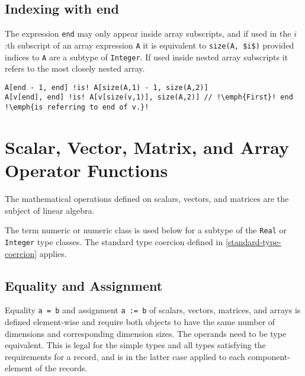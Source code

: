 \subsection{Indexing with end}\label{indexing-with-end}

The expression \lstinline!end! may only appear inside array subscripts, and if used in the $i$:th subscript of an array expression \lstinline!A! it is equivalent
to \lstinline!size(A, $i$)! provided indices to \lstinline!A! are a subtype of \lstinline!Integer!.  If used inside nested array subscripts it refers
to the most closely nested array.

\begin{example}
\begin{lstlisting}[language=modelica, escapechar=!]
A[end - 1, end] !is! A[size(A,1) - 1, size(A,2)]
A[v[end], end] !is! A[v[size(v,1)], size(A,2)] // !\emph{First}! end !\emph{is referring to end of v.}!
\end{lstlisting}
\end{example}

\section{Scalar, Vector, Matrix, and Array Operator Functions}\label{scalar-vector-matrix-and-array-operator-functions}

The mathematical operations defined on scalars, vectors, and matrices are the subject of linear algebra.

The term numeric or numeric class is used below for a subtype of the \lstinline!Real! or \lstinline!Integer! type classes.  The standard type coercion defined
in \cref{standard-type-coercion} applies.

\subsection{Equality and Assignment}\label{equality-and-assignment}

Equality \lstinline!a = b! and assignment \lstinline!a := b! of scalars, vectors, matrices, and
arrays is defined element-wise and require both objects to have the same
number of dimensions and corresponding dimension sizes. The operands
need to be type equivalent. This is legal for the simple types and all
types satisfying the requirements for a record, and is in the latter
case applied to each component-element of the records.

